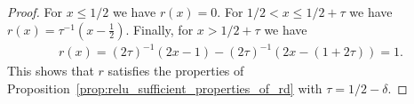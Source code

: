 \documentclass{amsart}[11pt]
\numberwithin{equation}{section}
\numberwithin{theorem}{section}
\begin{document}
\begin{proof}
            
        
        
        
        
        

        For $x \leq 1/2$ we have $r(x) = 0$. For $1/2 < x \leq 1/2 + \tau$ we have $ r(x) = \tau^{-1} \left(x - \frac{1}{2}\right) $. Finally, for $x > 1/2 + \tau$ we have 
        \begin{align*}
            r(x) = (2\tau)^{-1} \left(2x - 1\right) - (2\tau)^{-1} \left(2x - \left(1 + 2\tau\right) \right) = 1.
        \end{align*}
        This shows that $r$ satisfies the properties of Proposition~\ref{prop:relu_sufficient_properties_of_rd} with $\tau = 1/2 - \delta$.
\end{proof}
\end{document}
